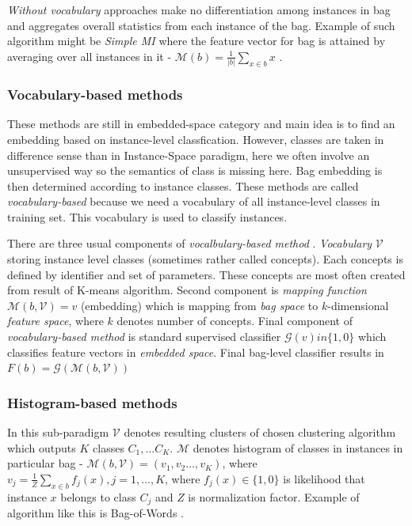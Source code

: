 \emph{Without vocabulary} approaches make no differentiation among instances in bag and aggregates overall statistics from each instance of the bag. Example of such algorithm might be \emph{Simple MI} where the feature vector for bag is attained by averaging over all instances in it - $\mathcal{M}(b)=\frac{1}{|b|}\sum_{x\in b}x$ \cite{Dong2006}.

\subsubsection{Vocabulary-based methods}
These methods are still in embedded-space category and main idea is to find an embedding based on instance-level classfication. However, classes are taken in difference sense than in Instance-Space paradigm, here we often involve an unsupervised way so the semantics of class is missing here. Bag embedding is then determined according to instance classes. These methods are called \emph{vocabulary-based} because we need a vocabulary of all instance-level classes in training set. This vocabulary is used to classify instances.

There are three usual components of \emph{vocalbulary-based method} \cite{Amores2013}. \emph{Vocabulary} $\mathcal{V}$ storing instance level classes (sometimes rather called concepts). Each concepts is defined by identifier and set of parameters. These concepts are most often created from result of K-means algorithm. Second component is \emph{mapping function} $\mathcal{M}(b, \mathcal{V})=v$ (embedding) which is mapping from \emph{bag space} to $k$-dimensional \emph{feature space}, where $k$ denotes number of concepts. Final component of \emph{vocabulary-based method} is standard supervised classifier $\mathcal{G}(v) in \{1,0\}$ which classifies feature vectors in \emph{embedded space}. Final bag-level classifier results in $F(b)=\mathcal{G}(\mathcal{M}(b,\mathcal{V}))$

\subsubsection{Histogram-based methods}
In this sub-paradigm $\mathcal{V}$ denotes resulting clusters of chosen clustering algorithm which outputs $K$ classes $C_1,\dots C_K$. $\mathcal{M}$ denotes histogram of classes in instances in particular bag - $\mathcal{M}(b,\mathcal{V})=(v_1,v_2\dots,v_K)$, where $v_j=\frac{1}{Z}\sum_{x\in b}f_{j}(x), j=1,\dots,K$, where $f_{j}(x) \in \{1,0\}$ is likelihood that instance $x$ belongs to class $C_j$ and $Z$ is normalization factor. Example of algorithm like this is Bag-of-Words \cite{Nowak2006}.

